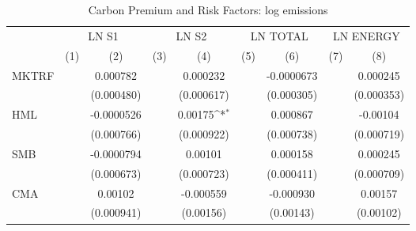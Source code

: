 \begin{table}[htbp]\centering
\def\sym#1{\ifmmode^{#1}\else\(^{#1}\)\fi}
\caption{Carbon Premium and Risk Factors: log emissions}
\begin{tabular}{l*{8}{c}}
\hline\hline
                    &\multicolumn{2}{c}{LN S1}                  &\multicolumn{2}{c}{LN S2}                  &\multicolumn{2}{c}{LN TOTAL}               &\multicolumn{2}{c}{LN ENERGY}              \\\cmidrule(lr){2-3}\cmidrule(lr){4-5}\cmidrule(lr){6-7}\cmidrule(lr){8-9}
                    &\multicolumn{1}{c}{(1)}         &\multicolumn{1}{c}{(2)}         &\multicolumn{1}{c}{(3)}         &\multicolumn{1}{c}{(4)}         &\multicolumn{1}{c}{(5)}         &\multicolumn{1}{c}{(6)}         &\multicolumn{1}{c}{(7)}         &\multicolumn{1}{c}{(8)}         \\
\hline
MKTRF               &                     &    0.000782         &                     &    0.000232         &                     &  -0.0000673         &                     &    0.000245         \\
                    &                     &  (0.000480)         &                     &  (0.000617)         &                     &  (0.000305)         &                     &  (0.000353)         \\
[1em]
HML                 &                     &  -0.0000526         &                     &     0.00175\sym{*}  &                     &    0.000867         &                     &    -0.00104         \\
                    &                     &  (0.000766)         &                     &  (0.000922)         &                     &  (0.000738)         &                     &  (0.000719)         \\
[1em]
SMB                 &                     &  -0.0000794         &                     &     0.00101         &                     &    0.000158         &                     &    0.000245         \\
                    &                     &  (0.000673)         &                     &  (0.000723)         &                     &  (0.000411)         &                     &  (0.000709)         \\
[1em]
CMA                 &                     &     0.00102         &                     &   -0.000559         &                     &   -0.000930         &                     &     0.00157         \\
                    &                     &  (0.000941)         &                     &   (0.00156)         &                     &   (0.00143)         &                     &   (0.00102)         \\

\end{tabular}
\end{table}

